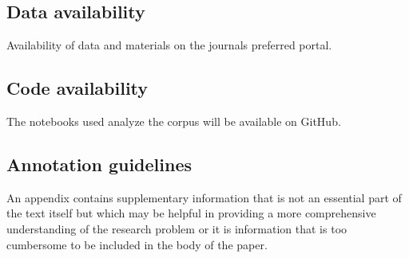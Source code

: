 \documentclass[sn-mathphys,Numbered]{sn-jnl}%
\theoremstyle{thmstyleone}%
\theoremstyle{thmstyletwo}%
\theoremstyle{thmstylethree}%
\begin{document}
\subsection*{Data availability}
%
Availability of data and materials on the journals preferred portal.
%
%
%
\subsection*{Code availability}
%
The notebooks used analyze the corpus will be available on GitHub.
%
%
%
%
%
%
%
%
\begin{appendices}
%
%
%
\section{Annotation guidelines}\label{annot_guidelines}
%
An appendix contains supplementary information that is not an essential part of the text itself but which may be helpful in providing a more comprehensive understanding of the research problem or it is information that is too cumbersome to be included in the body of the paper.
%
%
%
\end{appendices}


\end{document}
